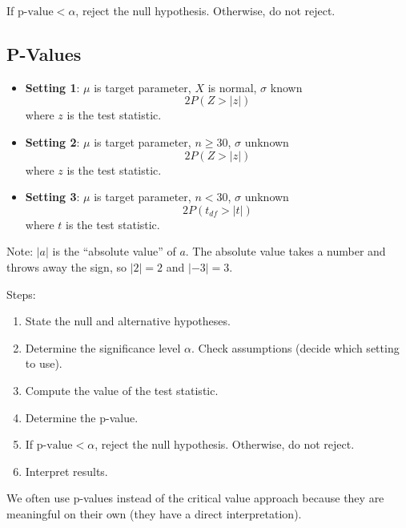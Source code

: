 \documentclass[
]{book}
\providecommand{\tightlist}{%
  \setlength{\itemsep}{0pt}\setlength{\parskip}{0pt}}
\begin{document}
If \(\text{p-value} < \alpha\), reject the null hypothesis. Otherwise, do not reject.

\hypertarget{p-values}{%
\subsection{P-Values}\label{p-values}}

\begin{itemize}
\item
  \textbf{Setting 1}: \(\mu\) is target parameter, \(X\) is normal, \(\sigma\) known \[2P(Z > |z|)\] where \(z\) is the test statistic.
\item
  \textbf{Setting 2}: \(\mu\) is target parameter, \(n \ge 30\), \(\sigma\) unknown \[2P(Z > |z|)\] where \(z\) is the test statistic.
\item
  \textbf{Setting 3}: \(\mu\) is target parameter, \(n < 30\), \(\sigma\) unknown \[2P(t_{df} > |t|)\] where \(t\) is the test statistic.
\end{itemize}

Note: \(|a|\) is the ``absolute value'' of \(a\). The absolute value takes a number and throws away the sign, so \(|2|=2\) and \(|-3|=3\).

Steps:

\begin{enumerate}
\def\labelenumi{\arabic{enumi}.}
\tightlist
\item
  State the null and alternative hypotheses.
\item
  Determine the significance level \(\alpha\). Check assumptions (decide which setting to use).
\item
  Compute the value of the test statistic.
\item
  Determine the p-value.
\item
  If \(\text{p-value} < \alpha\), reject the null hypothesis. Otherwise, do not reject.
\item
  Interpret results.
\end{enumerate}

We often use p-values instead of the critical value approach because they are meaningful on their own (they have a direct interpretation).
\end{document}
